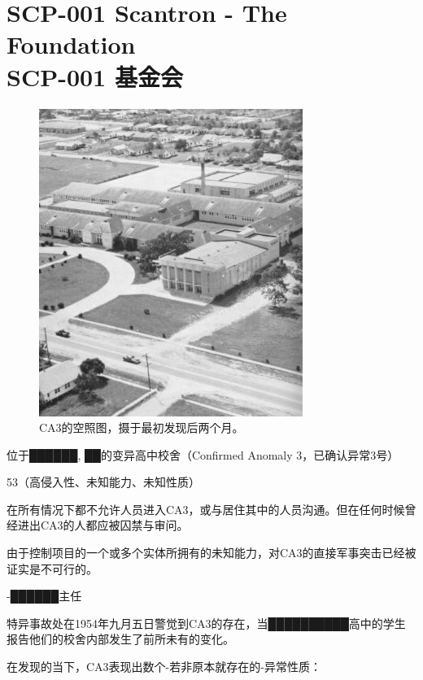 \chapter[SCP-001 基金会]{
	SCP-001 Scantron - The Foundation \\
	SCP-001 基金会
}

\label{chap:SCP-001.the.foundation}

\begin{figure}[H]
	\centering
	\includegraphics[width=0.5\linewidth]{images/SCP.001.the.foundation.jpg}
	\caption*{CA3的空照图，摄于最初发现后两个月。}
\end{figure}

 位于██████, ██的变异高中校舍（Confirmed Anomaly 3，已确认异常3号）

53（高侵入性、未知能力、未知性质）


在所有情况下都不允许人员进入CA3，或与居住其中的人员沟通。但在任何时候曾经进出CA3的人都应被囚禁与审问。

由于控制项目的一个或多个实体所拥有的未知能力，对CA3的直接军事突击已经被证实是不可行的。

 -██████主任

特异事故处在1954年九月五日警觉到CA3的存在，当██████████高中的学生报告他们的校舍内部发生了前所未有的变化。

在发现的当下，CA3表现出数个-若非原本就存在的-异常性质：

